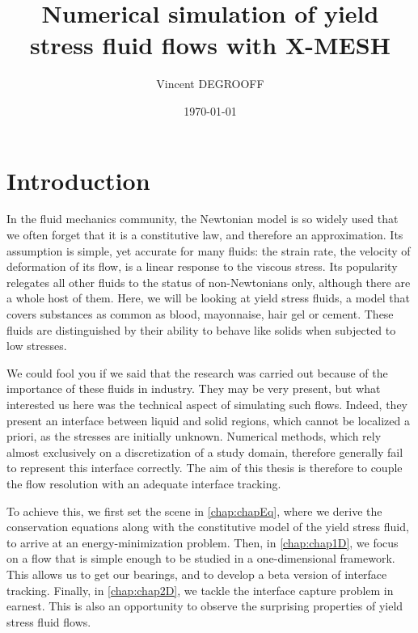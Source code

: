 \documentclass[11 pt]{report}
\title{{\Huge Numerical simulation of yield stress fluid flows with X-MESH}}
\author{Vincent \textsc{DEGROOFF}}
\date{\today}
\begin{document}
 
%
\maketitle

\setcounter{tocdepth}{1}
\tableofcontents





\clearpage
{}
\chapter*{Introduction}
In the fluid mechanics community, the Newtonian model is so widely used that we often forget that it is a constitutive law, and therefore an approximation. Its assumption is simple, yet accurate for many fluids: the strain rate, the velocity of deformation of its flow, is a linear response to the viscous stress. Its popularity relegates all other fluids to the status of non-Newtonians only, although there are a whole host of them. Here, we will be looking at yield stress fluids, a model that covers substances as common as blood, mayonnaise, hair gel or cement. These fluids are distinguished by their ability to behave like solids when subjected to low stresses.

We could fool you if we said that the research was carried out because of the importance of these fluids in industry. They may be very present, but what interested us here was the technical aspect of simulating such flows. Indeed, they present an interface between liquid and solid regions, which cannot be localized a priori, as the stresses are initially unknown. Numerical methods, which rely almost exclusively on a discretization of a study domain, therefore generally fail to represent this interface correctly. The aim of this thesis is therefore to couple the flow resolution with an adequate interface tracking.

To achieve this, we first set the scene in \cref{chap:chapEq}, where we derive the conservation equations along with the constitutive model of the yield stress fluid, to arrive at an energy-minimization problem. Then, in \cref{chap:chap1D}, we focus on a flow that is simple enough to be studied in a one-dimensional framework. This allows us to get our bearings, and to develop a beta version of interface tracking. Finally, in \cref{chap:chap2D}, we tackle the interface capture problem in earnest. This is also an opportunity to observe the surprising properties of yield stress fluid flows.
\end{document}

